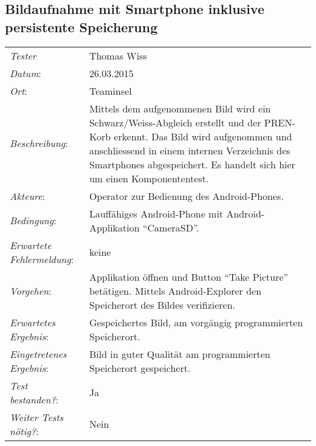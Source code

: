 \subsection{Bildaufnahme mit Smartphone inklusive persistente Speicherung}
\begin{tabular}{p{4.5cm}p{\textwidth-3.6cm-0.7cm}}
    \rule{0pt}{11pt}\textit{Tester}              & Thomas Wiss \\ 
    \rule{0pt}{11pt}\textit{Datum}:           & 26.03.2015   \\
    \rule{0pt}{11pt}\textit{Ort}:             & Teaminsel \\
    \rule{0pt}{11pt}\textit{Beschreibung}:          & Mittels dem aufgenommenen Bild wird ein 
    Schwarz/Weiss-Abgleich erstellt und der PREN-Korb erkennt. Das Bild wird aufgenommen und 
    anschliessend in einem internen Verzeichnis des Smartphones abgespeichert. 
    Es handelt sich hier um einen Komponententest. \\
    \rule{0pt}{11pt}\textit{Akteure}:          & Operator zur Bedienung des Android-Phones. \\
    \rule{0pt}{11pt}\textit{Bedingung}:          & Lauffähiges Android-Phone mit 
    Android-Applikation \enquote{CameraSD}. \\
    \rule{0pt}{11pt}\textit{Erwartete Fehlermeldung}:          & keine \\
    \rule{0pt}{11pt}\textit{Vorgehen}:          & Applikation öffnen und Button \enquote{Take Picture}
     betätigen. Mittels Android-Explorer den Speicherort des Bildes verifizieren. \\
    \rule{0pt}{11pt}\textit{Erwartetes Ergebnis}:          & Gespeichertes Bild, am 
    vorgängig programmierten Speicherort. \\
    \rule{0pt}{11pt}\textit{Eingetretenes Ergebnis}:          & Bild in guter Qualität am 
    programmierten Speicherort gespeichert. \\
    \rule{0pt}{11pt}\textit{Test bestanden?}:          & Ja \\
    \rule{0pt}{11pt}\textit{Weiter Tests nötig?}:          & Nein \\
\end{tabular}    
   